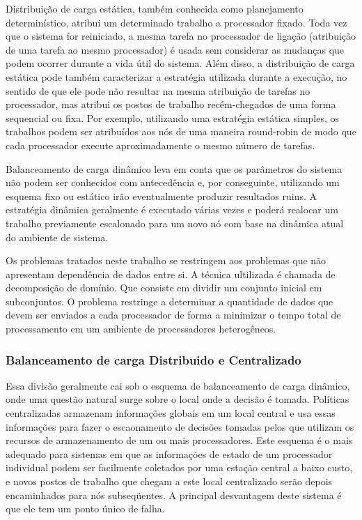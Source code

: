 Distribuição de carga estática, também conhecida como planejamento determinístico, atribui um determinado trabalho a processador fixado. Toda vez que o sistema for reiniciado, a mesma tarefa no processador de ligação (atribuição de uma tarefa ao mesmo processador) é usada sem considerar as mudanças que podem ocorrer durante a vida útil do sistema. Além disso, a distribuição de carga estática pode também caracterizar a estratégia utilizada durante a execução, no sentido de que ele pode não resultar na mesma atribuição de tarefas no processador, mas atribui os postos de trabalho recém-chegados de uma forma sequencial ou fixa. Por exemplo, utilizando uma estratégia estática simples, os trabalhos podem ser atribuídos aos nós de uma maneira round-robin de modo que cada processador execute aproximadamente o mesmo número de tarefas. 

Balanceamento de carga dinâmico leva em conta que os parâmetros do sistema não podem ser conhecidos com antecedência e, por conseguinte, utilizando um esquema fixo ou estático irão eventualmente produzir resultados ruins. A estratégia dinâmica geralmente é executado várias vezes e poderá realocar um trabalho previamente escalonado para um novo nó com base na dinâmica atual do ambiente de sistema.

Os problemas tratados neste trabalho se restringem aos problemas que não apresentam dependência de dados entre si. A técnica ultilizada é chamada de decomposição de domínio. Que consiste em dividir um conjunto inicial em subconjuntos. O problema restringe a determinar a quantidade de dados que devem ser enviados a cada processador de forma a minimizar o tempo total de processamento em um ambiente de processadores heterogêneos. 

\subsubsection{Balanceamento de carga Distribuido e Centralizado}

Essa divisão geralmente cai sob o esquema de balanceamento de carga dinâmico, onde uma questão natural surge sobre o local onde a decisão é tomada. Políticas centralizadas armazenam informações globais em um local central e usa essas informações para fazer o escaonamento de decisões tomadas pelos que utilizam os recursos de armazenamento de um ou mais processadores. Este esquema é o mais adequado para sistemas em que as informações de estado de um processador individual podem ser facilmente coletados por uma estação central a baixo custo, e novos postos de trabalho que chegam a este local centralizado serão depois encaminhados para nós subseqüentes. A principal desvantagem deste sistema é que ele tem um ponto único de falha. 

